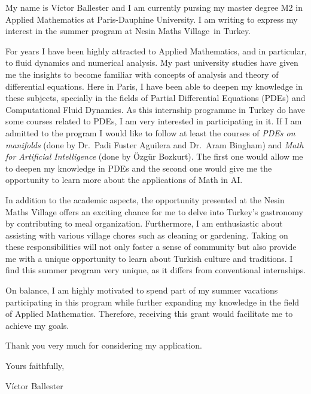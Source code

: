 \documentclass{letter}
\date{\today}
\newcommand{\intern}{summer program at Nesin Maths Village}
\begin{document}
\begin{letter}
  \hfill

  My name is Víctor Ballester and I am currently pursing my master degree M2 in Applied Mathematics at Paris-Dauphine University. I am writing to express my interest in the \intern\ in Turkey.

  For years I have been highly attracted to Applied Mathematics, and in particular, to fluid dynamics and numerical analysis. My past university studies have given me the insights to become familiar with concepts of analysis and theory of differential equations. Here in Paris, I have been able to deepen my knowledge in these subjects, specially in the fields of Partial Differential Equations (PDEs) and Computational Fluid Dynamics. As this internship programme in Turkey do have some courses related to PDEs, I am very interested in participating in it. If I am admitted to the program I would like to follow at least the courses of \textit{PDEs on manifolds} (done by Dr.\ Padi Fuster Aguilera and Dr.\ Aram Bingham) and \textit{Math for Artificial Intelligence} (done by Özgür Bozkurt). The first one would allow me to deepen my knowledge in PDEs and the second one would give me the opportunity to learn more about the applications of Math in AI.

  In addition to the academic aspects, the opportunity presented at the Nesin Maths Village offers an exciting chance for me to delve into Turkey's gastronomy by contributing to meal organization. Furthermore, I am enthusiastic about assisting with various village chores such as cleaning or gardening. Taking on these responsibilities will not only foster a sense of community but also  provide me with a unique opportunity to learn about Turkish culture and traditions. I find this summer program very unique, as it differs from conventional internships.

  On balance, I am highly motivated to spend part of my summer vacations participating in this program while further expanding my knowledge in the field of Applied Mathematics. Therefore, receiving this grant would facilitate me to achieve my goals.

  Thank you very much for considering my application.
  \bigskip

  Yours faithfully,

  Víctor Ballester

\end{letter}
\end{document}
